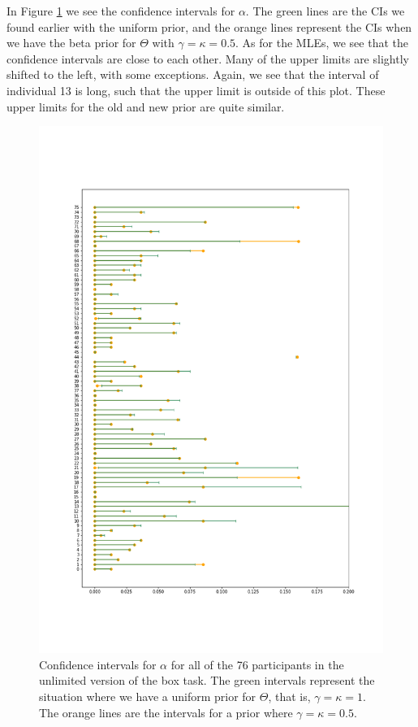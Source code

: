 In Figure \ref{fig:sensitivity_unlim_cis_alpha} we see the confidence intervals for $\alpha$. The green lines are the CIs we found earlier with the uniform prior, and the orange lines represent the CIs when we have the beta prior for $\Theta$ with $\gamma=\kappa=0.5$. As for the MLEs, we see that the confidence intervals are close to each other. Many of the upper limits are slightly shifted to the left, with some exceptions. Again, we see that the interval of individual 13 is long, such that the upper limit is outside of this plot. These upper limits for the old and new prior are quite similar. 
\begin{figure}
    \centering
    \includegraphics[scale=0.37]{pictures/Sensitivity/ci_unlim_alpha.png}
    \caption[CIs for $\alpha$ for all participants with two different priors, unlimited]{
    Confidence intervals for $\alpha$ for all of the 76 participants in the unlimited version of the box task. The green intervals represent the situation where we have a uniform prior for $\Theta$, that is, $\gamma=\kappa=1$. The orange lines are the intervals for a prior where $\gamma=\kappa=0.5$.}
    \label{fig:sensitivity_unlim_cis_alpha}
\end{figure}



